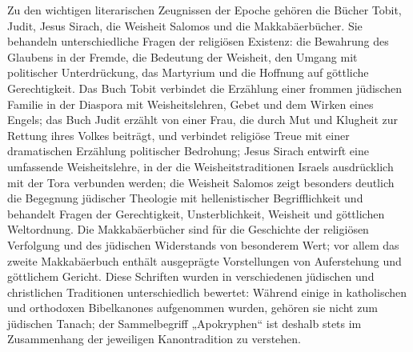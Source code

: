 \documentclass[fontsize=12pt]{mybib}
\begin{document}
Zu den wichtigen literarischen Zeugnissen der Epoche gehören die Bücher Tobit, Judit, Jesus Sirach, die Weisheit Salomos und die Makkabäerbücher. Sie behandeln unterschiedliche Fragen der religiösen Existenz: die Bewahrung des Glaubens in der Fremde, die Bedeutung der Weisheit, den Umgang mit politischer Unterdrückung, das Martyrium und die Hoffnung auf göttliche Gerechtigkeit. Das Buch Tobit verbindet die Erzählung einer frommen jüdischen Familie in der Diaspora mit Weisheitslehren, Gebet und dem Wirken eines Engels; das Buch Judit erzählt von einer Frau, die durch Mut und Klugheit zur Rettung ihres Volkes beiträgt, und verbindet religiöse Treue mit einer dramatischen Erzählung politischer Bedrohung; Jesus Sirach entwirft eine umfassende Weisheitslehre, in der die Weisheitstraditionen Israels ausdrücklich mit der Tora verbunden werden; die Weisheit Salomos zeigt besonders deutlich die Begegnung jüdischer Theologie mit hellenistischer Begrifflichkeit und behandelt Fragen der Gerechtigkeit, Unsterblichkeit, Weisheit und göttlichen Weltordnung. Die Makkabäerbücher sind für die Geschichte der religiösen Verfolgung und des jüdischen Widerstands von besonderem Wert; vor allem das zweite Makkabäerbuch enthält ausgeprägte Vorstellungen von Auferstehung und göttlichem Gericht. Diese Schriften wurden in verschiedenen jüdischen und christlichen Traditionen unterschiedlich bewertet: Während einige in katholischen und orthodoxen Bibelkanones aufgenommen wurden, gehören sie nicht zum jüdischen Tanach; der Sammelbegriff „Apokryphen“ ist deshalb stets im Zusammenhang der jeweiligen Kanontradition zu verstehen.
\end{document}
